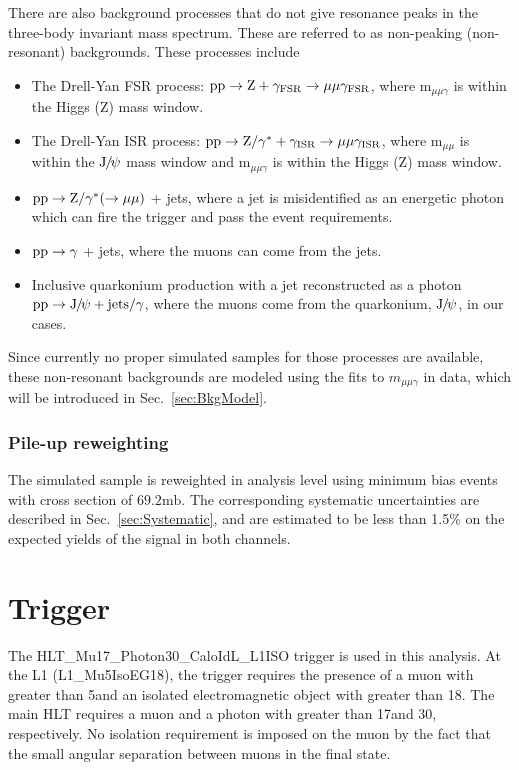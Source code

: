 There are also background processes that do not give resonance peaks in the three-body invariant mass spectrum. These are referred to as non-peaking (non-resonant) backgrounds. 
These processes include 
		\begin{itemize}
		\item The Drell-Yan FSR process: $\mathrm{p}\mathrm{p}\rightarrow \mathrm{Z}+\gamma_{\text{FSR}}\rightarrow\mu\mu\gamma_{\text{FSR}}$, where $\text{m}_{\mu\mu\gamma}$ is within the Higgs (Z) mass window.
		\item The Drell-Yan ISR process: $\mathrm{p}\mathrm{p}\rightarrow \mathrm{Z}/\gamma^{*}+\gamma_{\text{ISR}}\rightarrow\mu\mu\gamma_{\text{ISR}}$, where $\text{m}_{\mu\mu}$ is within the ${\mathrm{J}\hspace{-.08em}/\hspace{-.14em}\psi}$ mass window and $\text{m}_{\mu\mu\gamma}$ is within the Higgs (Z) mass window. 
		\item $\mathrm{p}\mathrm{p}\rightarrow \mathrm{Z}/\gamma^* (\rightarrow\mu\mu)$ + jets, where a jet is misidentified as an energetic photon which can fire the trigger and pass the event requirements.
		\item $\mathrm{p}\mathrm{p}\rightarrow\gamma$ + jets, where the muons can come from the jets.
		\item Inclusive quarkonium production with a jet reconstructed as a photon $\mathrm{p}\mathrm{p}\to {\mathrm{J}\hspace{-.08em}/\hspace{-.14em}\psi}+\text{jets}/\gamma$, where the muons come from the quarkonium, ${\mathrm{J}\hspace{-.08em}/\hspace{-.14em}\psi}$, in our cases.
		\end{itemize}
		Since currently no proper simulated samples for those processes are available, these non-resonant backgrounds are modeled using the fits to $m_{\mu\mu\gamma}$ in data, which will be introduced in Sec.~\ref{sec:BkgModel}.
		
		\subsubsection*{Pile-up reweighting}
		The simulated sample is reweighted in analysis level using minimum bias events with cross section of $69.2\text{mb}$. The corresponding systematic uncertainties are described in Sec.~\ref{sec:Systematic}, and are estimated to be less than 1.5\% on the expected yields of the signal in both channels.
		
		\section{Trigger}  
		The HLT\_Mu17\_Photon30\_CaloIdL\_L1ISO trigger is used in this analysis. 
		At the L1 (L1\_Mu5IsoEG18), the trigger requires the presence of a muon with \pt greater than 5\GeV and an isolated electromagnetic object with \pt greater than 18\GeV . The main HLT requires a muon and a photon with \pt greater than 17\GeV and 30\GeV, respectively.  
		No isolation requirement is imposed on the muon by the fact that the small angular separation between muons in the final state. 

